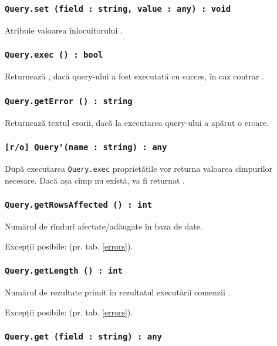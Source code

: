\subsubsection{\lstinline|Query.set (field : string, value : any) : void|}

Atribuie valoarea înlocuitorului .

\subsubsection{\lstinline|Query.exec () : bool|}

Returnează \true, dacă query-ului a fost executată cu succes, în caz contrar \false.

\subsubsection{\lstinline|Query.getError () : string|}

Returnează textul erorii, dacă la executarea query-ului a apărut o eroare.

\subsubsection{\lstinline|[r/o] Query'(name : string) : any|}

După executarea \lstinline|Query.exec| proprietățile vor returna valoarea cîmpurilor necesare. Dacă așa cîmp nu există, va fi returnat \void.

\subsubsection{\lstinline|Query.getRowsAffected () : int|}

Numărul de rînduri afectate/adăugate în baza de date.

Excepții posibile:  (pr. tab. \ref{errors}).

\subsubsection{\lstinline|Query.getLength () : int|}

Numărul de rezultate primit în rezultatul executării comenzii .

Excepții posibile:  (pr. tab. \ref{errors}).

\subsubsection{\lstinline|Query.get (field : string) : any|}

